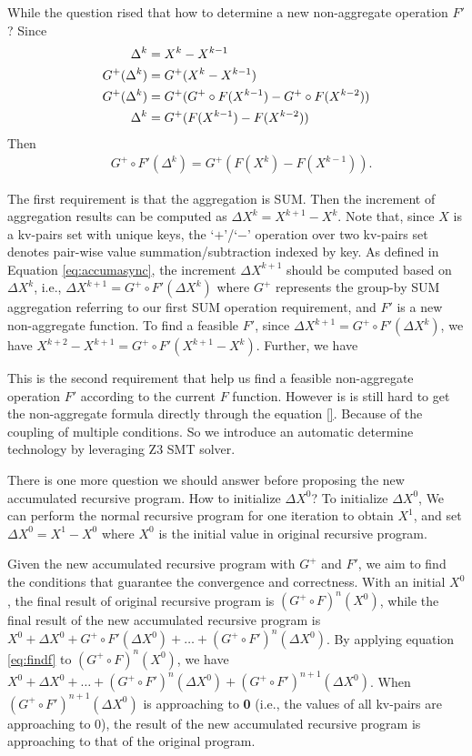 {While the question rised that how to determine a new non-aggregate operation $F'$? Since
\begin{equation}
\label{eq:inferr}
\begin{aligned}
\Delta^k&=X^k-X^{k-1}\\
G^+(\Delta^{k})&=G^+(X^k-X^{k-1})\\
G^+(\Delta^{k})&=G^+(G^+\circ F(X^{k-1})-G^+\circ F(X^{k-2}))\\
\Delta^{k}&=G^+(F(X^{k-1})-F(X^{k-2}))\notag
\end{aligned}
\end{equation}
Then
\begin{equation}
\label{eq:findf}
\begin{aligned}
&G^+\circ F'(\Delta^{k})=G^+(F(X^{k})-F(X^{k-1})).
\end{aligned}
\end{equation}
}

{\color{green}
The first requirement is that the aggregation is SUM. Then the increment of aggregation results can be computed as $\Delta X^k=X^{k+1}-X^k$. Note that, since $X$ is a kv-pairs set with unique keys, the `$+$'/`$-$' operation over two kv-pairs set denotes pair-wise value summation/subtraction indexed by key. As defined in Equation \ref{eq:accumasync}, the increment $\Delta X^{k+1}$ should be computed based on $\Delta X^k$, i.e., $\Delta X^{k+1}=G^{+}\circ F'(\Delta X^k)$ where $G^{+}$ represents the group-by SUM aggregation referring to our first SUM operation requirement, and $F'$ is a new non-aggregate function. To find a feasible $F'$, since $\Delta X^{k+1}=G^{+}\circ F'(\Delta X^k)$, we have $X^{k+2}-X^{k+1}=G^{+}\circ F'(X^{k+1}-X^k)$. Further, we have
}

This is the second requirement that help us find a feasible non-aggregate operation $F'$ according to the current $F$ function. However is is still hard to get the non-aggregate formula directly through the equation \ref{}. Because of the coupling of multiple conditions. So we introduce an automatic determine technology by leveraging Z3 SMT solver.
{\color{green} There is one more question we should answer before proposing the new accumulated recursive program. How to initialize $\Delta X^0$? To initialize $\Delta X^0$,  We can perform the normal recursive program for one iteration to obtain $X^1$, and set $\Delta X^0=X^1-X^0$ where $X^0$ is the initial value in original recursive program.

Given the new accumulated recursive program with $G^+$ and $F'$, we aim to find the conditions that guarantee the convergence and correctness. With an initial $X^0$, the final result of original recursive program is $(G^{+}\circ F)^n(X^0)$, while the final result of the new accumulated recursive program is $X^0+\Delta X^0+G^+\circ F'(\Delta X^0)+\ldots+(G^+\circ F')^n(\Delta X^0)$. By applying equation \ref{eq:findf} to $(G^{+}\circ F)^n(X^0)$, we have $X^0+\Delta X^0+\ldots+(G^+\circ F')^n(\Delta X^0)+(G^+\circ F')^{n+1}(\Delta X^0)$. When $(G^+\circ F')^{n+1}(\Delta X^0)$ is approaching to \textbf{0} (i.e., the values of all kv-pairs are approaching to 0), the result of the new accumulated recursive program is approaching to that of the original program.
}

